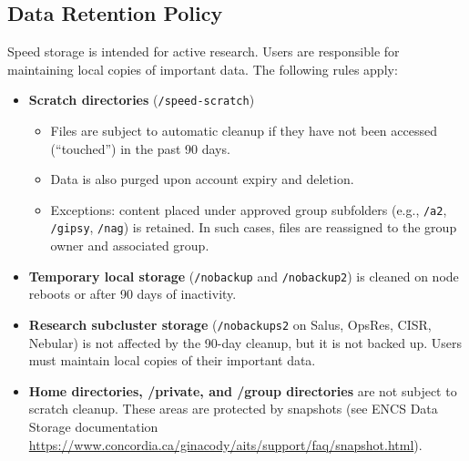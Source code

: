 \subsection{Data Retention Policy}
\label{sect:data-retention-policy}

Speed storage is intended for active research. Users are responsible for maintaining local copies of important data. The following rules apply:

\begin{itemize}
	\item \textbf{Scratch directories} (\texttt{/speed-scratch}) 
	\begin{itemize}
		\item Files are subject to automatic cleanup if they have not been accessed (“touched”) in the past 90 days.
		\item Data is also purged upon account expiry and deletion.
		\item Exceptions: content placed under approved group subfolders (e.g., \texttt{/a2}, \texttt{/gipsy}, \texttt{/nag}) is retained. In such cases, files are reassigned to the group owner and associated group.
	\end{itemize}

	\item \textbf{Temporary local storage} (\texttt{/nobackup} and \texttt{/nobackup2}) is cleaned on node reboots or after 90 days of inactivity.
	
	\item \textbf{Research subcluster storage} (\texttt{/nobackups2} on Salus, OpsRes, CISR, Nebular) is not affected by the 90-day cleanup, but it is not backed up. Users must maintain local copies of their important data.
    
	\item \textbf{Home directories, /private, and /group directories} are not subject to scratch cleanup. These areas are protected by snapshots (see ENCS Data Storage documentation \url{https://www.concordia.ca/ginacody/aits/support/faq/snapshot.html}).

\end{itemize}